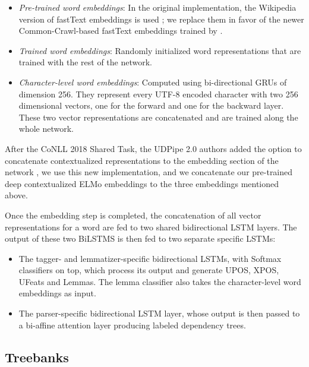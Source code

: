 \begin{itemize}
    \item \emph{Pre-trained word embeddings}: In the original implementation, the Wikipedia version of fastText embeddings is used \citep{bojanowski-etal-2017-enriching}; we replace them in favor of the newer Common-Crawl-based fastText embeddings trained by \citet{grave-etal-2018-learning}.
    \item \emph{Trained word embeddings}: Randomly initialized word representations that are trained with the rest of the network.
    \item \emph{Character-level word embeddings}: Computed using bi-directional GRUs of dimension 256. They represent every UTF-8 encoded character with two 256 dimensional vectors, one for the forward and one for the backward layer. These two vector representations are concatenated and are trained along the whole network.
\end{itemize}

After the CoNLL 2018 Shared Task, the UDPipe 2.0 authors added the option to concatenate contextualized representations to the embedding section of the network \citep{straka-strakova-2019-evaluating}, we use this new implementation, and we concatenate our pre-trained deep contextualized ELMo embeddings to the three embeddings mentioned above.

Once the embedding step is completed, the concatenation of all vector representations for a word are fed to two shared bidirectional LSTM \citep{hochreiter-schmidhuber-1997-long} layers. The output of these two BiLSTMS is then fed to two separate specific LSTMs:
\begin{itemize}
    \item The tagger- and lemmatizer-specific bidirectional LSTMs, with Softmax classifiers on top, which process its output and generate UPOS, XPOS, UFeats and Lemmas. The lemma classifier also takes the character-level word embeddings as input.

    \item The parser-specific bidirectional LSTM layer, whose output is then passed to a bi-affine attention layer \citep{dozat-manning-2017-deep} producing labeled dependency trees.
\end{itemize}

\subsection{Treebanks}

